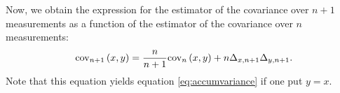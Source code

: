 \documentclass[twoside]{book}
\begin{document}
Now, we obtain the expression for the estimator of the covariance
over $n+1$ measurements as a function of the estimator of the
covariance over $n$ measurements:
\begin{equation}
 \ {\cov}_{n+1}\left(x,y\right)={n\over
 n+1}{\cov}_n\left(x,y\right)+n\Delta_{x,n+1}\Delta_{y,n+1}.
\end{equation}
Note that this equation yields equation \ref{eq:accumvariance} if
one put $y=x$.

\ifx\wholebook\relax\else
\end{document}

